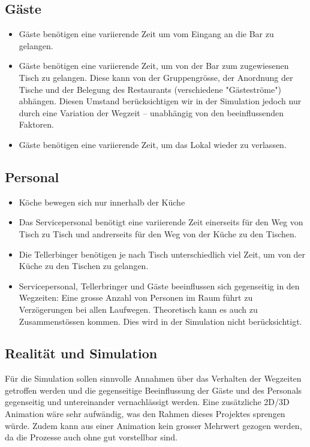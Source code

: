 \documentclass[ngerman,a4paper,12pt]{scrreprt}
\begin{document}
	\subsection{Gäste}
		\begin{itemize}
			\item Gäste benötigen eine variierende Zeit um vom Eingang an die Bar zu gelangen. 
			\item Gäste benötigen eine variierende Zeit, um von der Bar zum zugewiesenen Tisch zu gelangen.
			Diese kann von der Gruppengrösse, der Anordnung der Tische und der Belegung des Restaurants (verschiedene "Gästeströme") abhängen. Diesen Umstand berücksichtigen wir in der Simulation jedoch nur durch eine Variation der Wegzeit -- unabhängig von den beeinflussenden Faktoren.
			\item Gäste benötigen eine variierende Zeit, um das Lokal wieder zu verlassen.
		\end{itemize}

	\subsection{Personal}
		\begin{itemize}
			\item Köche bewegen sich nur innerhalb der Küche
			\item Das Servicepersonal benötigt eine variierende Zeit einerseits für den Weg von Tisch zu Tisch und andrerseits für den Weg von der Küche zu den Tischen.
			\item Die Tellerbinger benötigen je nach Tisch unterschiedlich viel Zeit, um von der Küche zu den Tischen zu gelangen.
			\item Servicepersonal, Tellerbringer und Gäste beeinflussen sich gegenseitig in den Wegzeiten: Eine grosse Anzahl von Personen im Raum führt zu Verzögerungen bei allen Laufwegen. Theoretisch kann es auch zu Zusammenstössen kommen. Dies wird in der Simulation nicht berücksichtigt.
		\end{itemize}

	\subsection{Realität und Simulation}
		Für die Simulation sollen sinnvolle Annahmen über das Verhalten der Wegzeiten getroffen werden und die gegenseitige Beeinflussung der Gäste und des Personals gegenseitig und untereinander vernachlässigt werden. Eine zusätzliche 2D/3D Animation wäre sehr aufwändig, was den Rahmen dieses Projektes sprengen würde. Zudem kann aus einer Animation kein grosser Mehrwert gezogen werden, da die Prozesse auch ohne gut vorstellbar sind.
\end{document}
